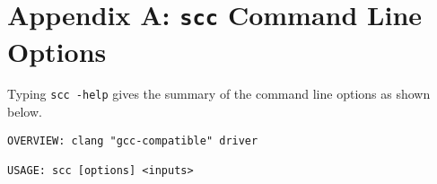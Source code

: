 \let\clearforchapter\par %

\appendix

\chapter*{Appendix A:  \texttt{scc} Command Line Options}
\label{app-scc}

Typing \texttt{scc -help} gives the summary of the command line options as shown 
below.

\par\bigskip
\begin{verbatim}
OVERVIEW: clang "gcc-compatible" driver

USAGE: scc [options] <inputs>


\end{verbatim}
